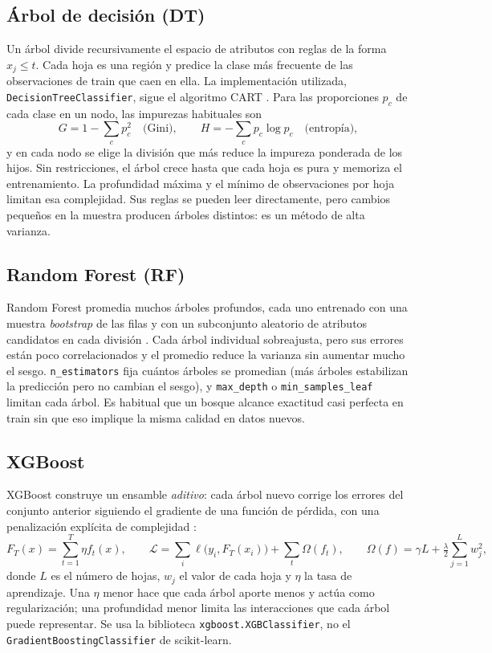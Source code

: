 \subsection{Árbol de decisión (DT)}
Un árbol divide recursivamente el espacio de atributos con reglas de la forma
$x_j\le t$. Cada hoja es una región y predice la clase más frecuente de las
observaciones de train que caen en ella. La implementación utilizada,
\texttt{DecisionTreeClassifier}, sigue el algoritmo CART \cite{sklearntree}. Para las
proporciones $p_c$ de cada clase en un nodo, las impurezas habituales son
\[
 G=1-\sum_c p_c^2 \quad\text{(Gini)}, \qquad H=-\sum_c p_c\log p_c \quad\text{(entropía)},
\]
y en cada nodo se elige la división que más reduce la impureza ponderada de los
hijos. Sin restricciones, el árbol crece hasta que cada hoja es pura y memoriza el
entrenamiento. La profundidad máxima y el mínimo de observaciones por hoja limitan
esa complejidad. Sus reglas se pueden leer directamente, pero cambios pequeños en la
muestra producen árboles distintos: es un método de alta varianza.

\subsection{Random Forest (RF)}
Random Forest promedia muchos árboles profundos, cada uno entrenado con una muestra
\emph{bootstrap} de las filas y con un subconjunto aleatorio de atributos candidatos
en cada división \cite{breiman,sklearnensemble}. Cada árbol individual sobreajusta,
pero sus errores están poco correlacionados y el promedio reduce la varianza sin
aumentar mucho el sesgo. \texttt{n\_estimators} fija cuántos árboles se promedian
(más árboles estabilizan la predicción pero no cambian el sesgo), y
\texttt{max\_depth} o \texttt{min\_samples\_leaf} limitan cada árbol. Es habitual que
un bosque alcance exactitud casi perfecta en train sin que eso implique la misma
calidad en datos nuevos.

\subsection{XGBoost}
XGBoost construye un ensamble \emph{aditivo}: cada árbol nuevo corrige los errores
del conjunto anterior siguiendo el gradiente de una función de pérdida, con una
penalización explícita de complejidad \cite{chen,xgboostmodel}:
\[
 F_T(x)=\sum_{t=1}^{T}\eta f_t(x),\qquad
 \mathcal L=\sum_i\ell\bigl(y_i,F_T(x_i)\bigr)+\sum_t\Omega(f_t),
 \qquad \Omega(f)=\gamma L+\tfrac{\lambda}{2}\sum_{j=1}^{L}w_j^2,
\]
donde $L$ es el número de hojas, $w_j$ el valor de cada hoja y $\eta$ la tasa de
aprendizaje. Una $\eta$ menor hace que cada árbol aporte menos y actúa como
regularización; una profundidad menor limita las interacciones que cada árbol
puede representar. Se usa la biblioteca \texttt{xgboost.XGBClassifier}, no el
\texttt{GradientBoostingClassifier} de scikit-learn.

